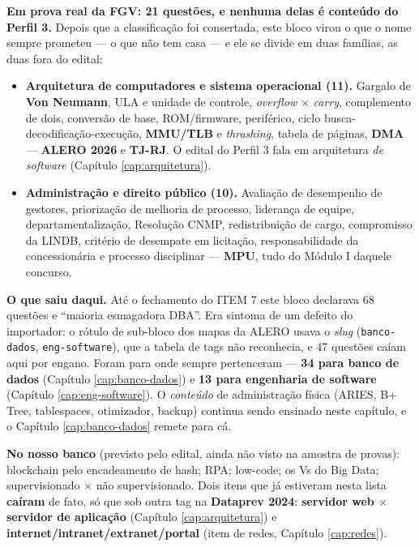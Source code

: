 \begin{jacaiu}
\textbf{Em prova real da FGV: 21 questões, e nenhuma delas é conteúdo do
Perfil 3.} Depois que a classificação foi consertada, este bloco virou o que o
nome sempre prometeu --- o que não tem casa --- e ele se divide em duas
famílias, as duas fora do edital:

\begin{itemize}
\item \textbf{Arquitetura de computadores e sistema operacional (11).}
Gargalo de \textbf{Von Neumann}, ULA e unidade de controle, \emph{overflow}
$\times$ \emph{carry}, complemento de dois, conversão de base, ROM/firmware,
periférico, ciclo busca-decodificação-execução, \textbf{MMU/TLB} e
\emph{thrashing}, tabela de páginas, \textbf{DMA} --- \textbf{ALERO 2026} e
\textbf{TJ-RJ}. O edital do Perfil 3 fala em arquitetura \emph{de software}
(Capítulo \ref{cap:arquitetura}).
\item \textbf{Administração e direito público (10).} Avaliação de desempenho
de gestores, priorização de melhoria de processo, liderança de equipe,
departamentalização, Resolução CNMP, redistribuição de cargo, compromisso da
LINDB, critério de desempate em licitação, responsabilidade da concessionária
e processo disciplinar --- \textbf{MPU}, tudo do Módulo I daquele concurso.
\end{itemize}

\textbf{O que saiu daqui.} Até o fechamento do ITEM 7 este bloco declarava 68
questões e ``maioria esmagadora DBA''. Era sintoma de um defeito do
importador: o rótulo de sub-bloco dos mapas da ALERO usava o \emph{slug}
(\texttt{banco-dados}, \texttt{eng-software}), que a tabela de tags não
reconhecia, e 47 questões caíam aqui por engano. Foram para onde sempre
pertenceram --- \textbf{34 para banco de dados} (Capítulo
\ref{cap:banco-dados}) e \textbf{13 para engenharia de software} (Capítulo
\ref{cap:eng-software}). O \emph{conteúdo} de administração física (ARIES,
B+ Tree, tablespaces, otimizador, backup) continua sendo ensinado neste
capítulo, e o Capítulo \ref{cap:banco-dados} remete para cá.

\textbf{No nosso banco} (previsto pelo edital, ainda não visto na amostra de
provas): blockchain pelo encadeamento de hash; RPA; low-code; os Vs do Big
Data; supervisionado $\times$ não supervisionado. Dois itens que já estiveram
nesta lista \textbf{caíram} de fato, só que sob outra tag na
\textbf{Dataprev 2024}: \textbf{servidor web $\times$ servidor de aplicação}
(Capítulo \ref{cap:arquitetura}) e \textbf{internet/intranet/extranet/portal}
(item de redes, Capítulo \ref{cap:redes}).


\end{jacaiu}
